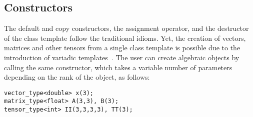 \documentclass[11pt]{article}
\def\ifmonospace{\ifdim\fontdimen3\font=0pt }
\def\C++{\ifmonospace C++\else C\kern-.1667em\raise.50ex\hbox{\tiny{\textbf{+}\kern-.1em\textbf{+}}}\fi \spacefactor1000 }
\newcommand{\code}[1]{{\footnotesize\ttfamily{#1}}}
\begin{document}
\subsection{Constructors}

The default and copy constructors, the assignment operator, and the destructor of the \code{Array} class template follow the traditional \C++ idioms.
Yet, the creation of vectors, matrices and other tensors from a single class template is possible due to the introduction of variadic templates~\cite{Gregor:2007}. The user can create algebraic objects by calling the same constructor, which takes a variable number of parameters depending on the rank of the object, as follows:
\begin{lstlisting}[frame=none]
vector_type<double> x(3);
matrix_type<float> A(3,3), B(3);
tensor_type<int> II(3,3,3,3), TT(3);
\end{lstlisting}
\end{document}
